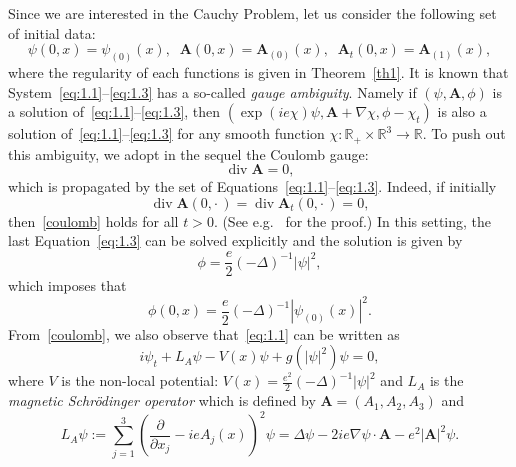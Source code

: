 \documentclass[AHL,Unicode,longabstracts]{cedram}
\newcommand{\BA}{\mathbf{A}}
\newcommand{\R}{\mathbb{R}}
\DeclareMathOperator{\Div}{div}
\begin{document}
Since we are interested in the Cauchy Problem, let us consider the following set of initial data:
\begin{equation}\label{initial}
\psi(0,x) =\psi_{(0)}(x), \;\; \BA (0,x)=\BA_{(0)}(x), \;\; \BA_t(0,x)=\BA_{(1)}(x),
\end{equation}
where the regularity of each functions is given in Theorem~\ref{th1}. It is known that System~\eqref{eq:1.1}--\eqref{eq:1.3} has a so-called \emph{gauge ambiguity}. Namely if $(\psi,\BA, \phi)$ is a solution of~\eqref{eq:1.1}--\eqref{eq:1.3}, then $(\exp(i e \chi)\psi,\BA+\nabla \chi, \phi-\chi_t)$ is also a solution of~\eqref{eq:1.1}--\eqref{eq:1.3} for any smooth function $\chi:\R_+ \times \R^3 \to \R$. To push out this ambiguity, we adopt in the sequel the Coulomb gauge:
\begin{equation}\label{coulomb}
\Div \BA=0,
\end{equation}
which is propagated by the set of Equations~\eqref{eq:1.1}--\eqref{eq:1.3}. Indeed, if initially
\[
\Div \BA(0,{\cdot\,})= \Div \BA_t (0,{\cdot\,})=0,
\]
then~\eqref{coulomb} holds for all $t>0$. (See e.g.~\cite{CW1} for the proof.) In this setting, the last Equation~\eqref{eq:1.3} can be solved explicitly and the solution is given by
\[
\phi=\frac{e}{2}(-\Delta)^{-1}|\psi|^2,
\]
which imposes that
\[
\phi(0,x) = \frac{e}{2}(-\Delta)^{-1}|\psi_{(0)}(x)|^2.
\]
From~\eqref{coulomb}, we also observe that~\eqref{eq:1.1} can be written as
\begin{equation}\label{MS}
i \psi_t + L_A \psi - V(x) \psi + g(|\psi|^2)\psi =0,
\end{equation}
where $V$ is the non-local potential: $V(x)=\frac{e^2}{2} (-\Delta)^{-1} |\psi|^2$ and $L_A$ is the \emph{magnetic Schr\"odinger operator} which is defined by $\BA=(A_1,A_2,A_3)$ and
\begin{equation}\label{mag}
L_A \psi := \sum_{j=1}^3 \left(\frac{\partial}{\partial x_j}-ieA_j(x) \right)^2 \psi = \Delta \psi - 2ie \nabla \psi \cdot \BA - e^2 |\BA|^2 \psi.
\end{equation}
\end{document}
